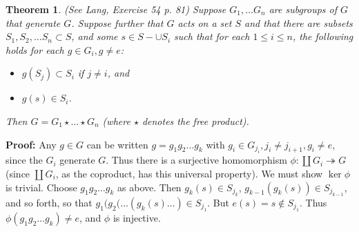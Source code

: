 \documentclass[12pt]{article}
\newtheorem{thm}{Theorem}
\begin{document}
\begin{thm} (See Lang, Exercise 54 p. 81) Suppose $G_1,\ldots G_n$ are subgroups of $G$ that generate $G$. Suppose further that $G$ acts on a set $S$ and that there are subsets $S_1,S_2,\ldots S_n\subset S$, and some $s\in S-\cup S_i$ such that for each $1\leq i\leq n$, the following holds for each $g\in G_i, g\neq e$:
\begin{itemize}
\item $g(S_j)\subset S_i$ if $j\neq i$, and
\item $g(s)\in S_i$.
\end{itemize}
Then $G=G_1\star\ldots\star G_n$ (where $\star$ denotes the free product).
\end{thm}

\textbf{Proof:}
Any $g\in G$ can be written $g=g_1g_2\ldots g_k$ with $g_i\in G_{j_i}, j_i\neq j_{i+1}, g_i\neq e$, since the $G_i$ generate $G$. Thus there is a surjective homomorphism $\phi:\coprod G_i\twoheadrightarrow G$ (since $\coprod G_i$, as the coproduct, has this universal property). We must show $\ker \phi$ is trivial. Choose $g_1g_2\ldots g_k$ as above. Then $g_k(s)\in S_{j_k}$, $g_{k-1}(g_k(s))\in S_{j_{k-1}}$, and so forth, so that $g_1(g_2(\ldots(g_k(s)\ldots)\in S_{j_1}$. But $e(s)=s\notin S_{j_1}$. Thus $\phi(g_1g_2\ldots g_k) \neq e$, and $\phi$ is injective.

\end{document}
